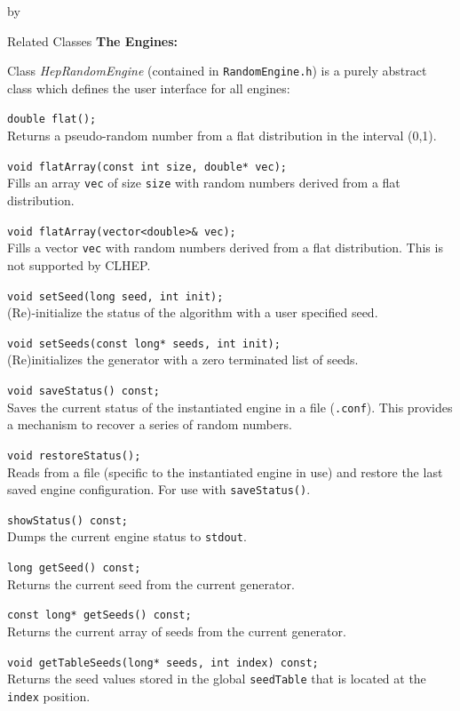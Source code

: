 \documentclass[twoside]{article}
\newcommand{\comp}[1]{\texttt{#1}}%
\newcommand{\entrylabel}[1]{\mbox{\textbf{{#1}}}\hfil}%
\newenvironment{entry}
{\begin{list}{}%
    {\renewcommand{\makelabel}{\entrylabel}%
     \setlength{\labelwidth}{90pt}%
     \setlength{\leftmargin}{\labelwidth}
     \advance\leftmargin by \labelsep%
      }%
    }%
  {\end{list}}
\newcommand{\Entrylabel}[1]%
{\raisebox{0pt}[1ex][0pt]{\makebox[\labelwidth][l]%
    {\parbox[t]{\labelwidth}{\hspace{0pt}\textbf{{#1}}}}}}
\newenvironment{Entry}%
{\renewcommand{\entrylabel}{\Entrylabel}\begin{entry}}%
  {\end{entry}}
\begin{document}
\begin{description}
\begin{Entry}
\item[Related Classes]
  {\bf The Engines:}
  
    Class {\em HepRandomEngine} (contained in \comp{RandomEngine.h}) is a purely
    abstract class which defines the user interface for all engines:

     \verb+double flat();+\\
     Returns a pseudo-random number from a flat distribution
     in the interval (0,1).

     \verb+void flatArray(const int size, double* vec);+\\
     Fills an array \comp{vec} of size \comp{size} with random
     numbers derived from a flat distribution.

     \verb+void flatArray(vector<double>& vec);+\\
     Fills a vector \comp{vec} with random
     numbers derived from a flat distribution.  This is
     not supported by CLHEP.
     
     \verb+void setSeed(long seed, int init);+\\
     (Re)-initialize the status of the algorithm with a user specified
     seed.
     
     \verb+void setSeeds(const long* seeds, int init);+\\
     (Re)initializes the generator with a zero terminated list of seeds.
     
     \verb+void saveStatus() const;+\\
     Saves the current status of the instantiated engine
     in a file (\comp{.conf}).  This provides a mechanism
     to recover a series of random numbers.

     \verb+void restoreStatus();+ \\
     Reads from a file (specific to the instantiated engine in use)
     and restore the last saved engine configuration.  For use with
     \comp{saveStatus()}.

     \verb+showStatus() const;+\\
     Dumps the current engine status to \comp{stdout}.

     \verb+long getSeed() const;+\\
     Returns the current seed from the current generator.

     \verb+const long* getSeeds() const;+\\
     Returns the current array of seeds from the current generator.

     \verb+void getTableSeeds(long* seeds, int index) const;+\\
     Returns the seed values stored in the global \comp{seedTable}
     that is located at the \comp{index} position.


\end{Entry}
\end{description}
\end{document}
